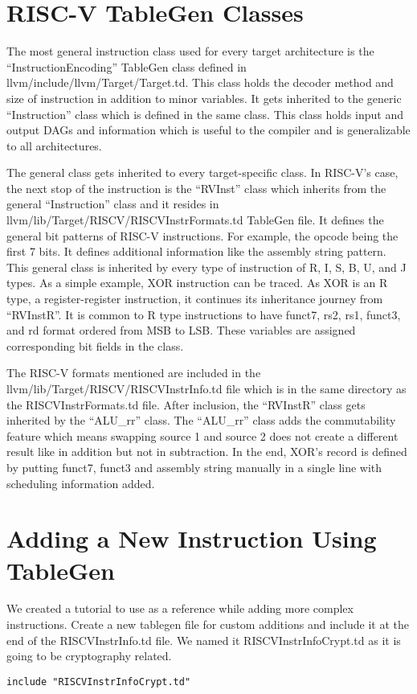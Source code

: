 \section{RISC-V TableGen Classes}
The most general instruction class used for every target architecture is the “InstructionEncoding” TableGen class defined in llvm/include/llvm/Target/Target.td. This class holds the decoder method and size of instruction in addition to minor variables. It gets inherited to the generic “Instruction” class which is defined in the same class. This class holds input and output DAGs and information which is useful to the compiler and is generalizable to all architectures.
\par

The general class gets inherited to every target-specific class. In RISC-V’s case, the next stop of the instruction is the “RVInst” class which inherits from the general “Instruction” class and it resides in llvm/lib/Target/RISCV/RISCVInstrFormats.td TableGen file. It defines the general bit patterns of RISC-V instructions. For example, the opcode being the first 7 bits. It defines additional information like the assembly string pattern. This general class is inherited by every type of instruction of R, I, S, B, U, and J types. As a simple example, XOR instruction can be traced. As XOR is an R type, a register-register instruction, it continues its inheritance journey from “RVInstR”. It is common to R type instructions to have funct7, rs2, rs1, funct3, and rd format ordered from MSB to LSB. These variables are assigned corresponding bit fields in the class. 
\par

The RISC-V formats mentioned are included in the llvm/lib/Target/RISCV/RISCVInstrInfo.td file which is in the same directory as the RISCVInstrFormats.td file. After inclusion, the “RVInstR” class gets inherited by the “ALU\_rr” class. The “ALU\_rr” class adds the commutability feature which means swapping source 1 and source 2 does not create a different result like in addition but not in subtraction. In the end, XOR’s record is defined by putting funct7, funct3 and assembly string manually in a single line with scheduling information added. 

\section{Adding a New Instruction Using TableGen}\label{sec:MLA_add_section}
We created a tutorial to use as a reference while adding more complex instructions.
Create a new tablegen file for custom additions and include it at the end of the RISCVInstrInfo.td file. We named it RISCVInstrInfoCrypt.td as it is going to be cryptography related.
\begin{lstlisting}[caption= Include file]
include "RISCVInstrInfoCrypt.td"
\end{lstlisting}

